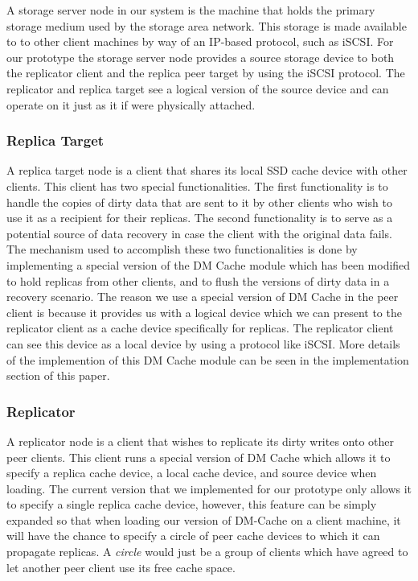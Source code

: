 A storage server node in our system is the machine that holds
the primary storage medium used by the storage area network.
This storage is made available to to other client machines by
way of an IP-based protocol, such as iSCSI. For our prototype
the storage server node provides a source storage device to
both the replicator client and the replica peer target by using
the iSCSI protocol. The replicator and replica target see a 
logical version of the source device and can operate on it just
as it if were physically attached.

\subsubsection{Replica Target}

A replica target node is a client that shares its local SSD
cache device with other clients. This client has two special
functionalities. The first functionality is to handle the copies
of dirty data that are sent to it by other clients who wish
to use it as a recipient for their replicas. The second 
functionality is to serve as a potential source of data recovery
in case the client with the original data fails. The mechanism
used to accomplish these two functionalities is done by 
implementing a special version of the DM Cache module which has
been modified to hold replicas from other clients, and to flush
the versions of dirty data in a recovery scenario. The reason
we use a special version of DM Cache in the peer client
is because it provides us with a logical device which we can
present to the replicator client as a cache device specifically
for replicas. The replicator client can see this device as a local
device by using a protocol like iSCSI. More details
of the implemention of this DM Cache module can be seen in the
implementation section of this paper.

\subsubsection{Replicator}

A replicator node is a client that wishes to replicate its dirty
writes onto other peer clients. This client runs a special version
of DM Cache which allows it to specify a replica cache device,
a local cache device, and source device when loading. The current 
version that we implemented for our prototype only allows it to 
specify a single replica cache device, however, this feature can 
be simply expanded so that when loading our version of DM-Cache on
a client machine, it will have the chance to specify a circle of 
peer cache devices to which it can propagate replicas.
A \textit{circle} 
would just be a group of clients which have agreed to let another
peer client use its free cache space. 


